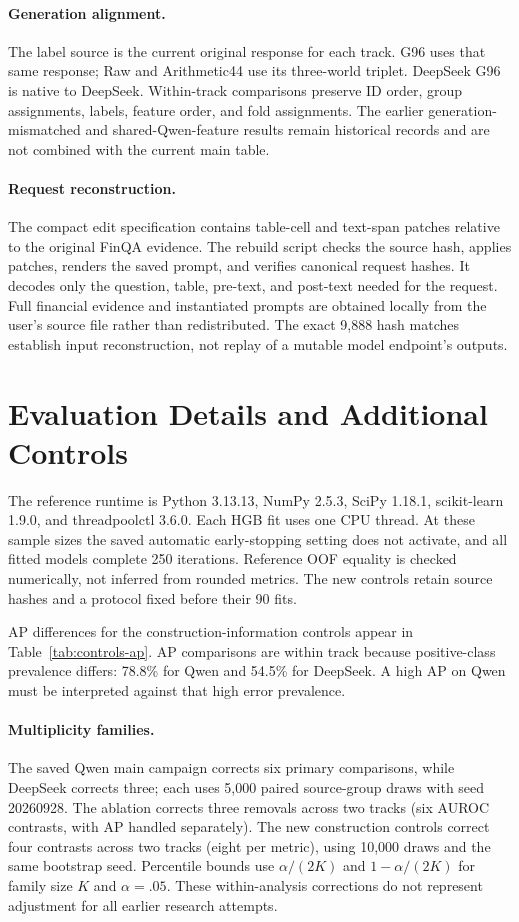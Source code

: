 \paragraph{Generation alignment.}
The label source is the current original response for each track. G96 uses that same response; Raw and Arithmetic44 use its three-world triplet. DeepSeek G96 is native to DeepSeek. Within-track comparisons preserve ID order, group assignments, labels, feature order, and fold assignments. The earlier generation-mismatched and shared-Qwen-feature results remain historical records and are not combined with the current main table.

\paragraph{Request reconstruction.}
The compact edit specification contains table-cell and text-span patches relative to the original FinQA evidence. The rebuild script checks the source hash, applies patches, renders the saved prompt, and verifies canonical request hashes. It decodes only the question, table, pre-text, and post-text needed for the request. Full financial evidence and instantiated prompts are obtained locally from the user's source file rather than redistributed. The exact 9,888 hash matches establish input reconstruction, not replay of a mutable model endpoint's outputs.

\section{Evaluation Details and Additional Controls}
\label{app:additional}
The reference runtime is Python 3.13.13, NumPy 2.5.3, SciPy 1.18.1, scikit-learn 1.9.0, and threadpoolctl 3.6.0. Each HGB fit uses one CPU thread. At these sample sizes the saved automatic early-stopping setting does not activate, and all fitted models complete 250 iterations. Reference OOF equality is checked numerically, not inferred from rounded metrics. The new controls retain source hashes and a protocol fixed before their 90 fits.



AP differences for the construction-information controls appear in Table~\ref{tab:controls-ap}. AP comparisons are within track because positive-class prevalence differs: 78.8\% for Qwen and 54.5\% for DeepSeek. A high AP on Qwen must be interpreted against that high error prevalence.

\paragraph{Multiplicity families.}
The saved Qwen main campaign corrects six primary comparisons, while DeepSeek corrects three; each uses 5,000 paired source-group draws with seed 20260928. The ablation corrects three removals across two tracks (six AUROC contrasts, with AP handled separately). The new construction controls correct four contrasts across two tracks (eight per metric), using 10,000 draws and the same bootstrap seed. Percentile bounds use $\alpha/(2K)$ and $1-\alpha/(2K)$ for family size $K$ and $\alpha=.05$. These within-analysis corrections do not represent adjustment for all earlier research attempts.

